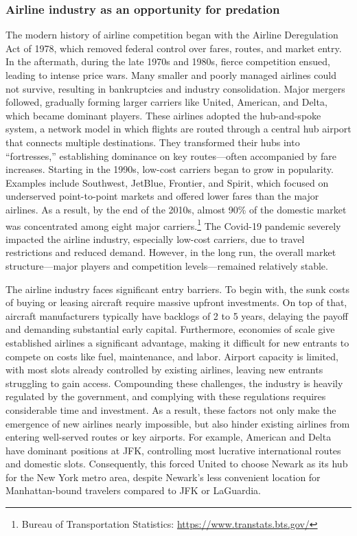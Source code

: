 \documentclass[12pt,oneside]{article}
\theoremstyle{definition}
\theoremstyle{remark}
\begin{document}
\subsubsection{Airline industry as an opportunity for predation}

The modern history of airline competition began with the Airline Deregulation Act of 1978, which removed federal control over fares, routes, and market entry. In the aftermath, during the late 1970s and 1980s, fierce competition ensued, leading to intense price wars. Many smaller and poorly managed airlines could not survive, resulting in bankruptcies and industry consolidation. Major mergers followed, gradually forming larger carriers like United, American, and Delta, which became dominant players. These airlines adopted the hub-and-spoke system, a network model in which flights are routed through a central hub airport that connects multiple destinations. They transformed their hubs into “fortresses,” establishing dominance on key routes—often accompanied by fare increases. Starting in the 1990s, low-cost carriers began to grow in popularity. Examples include Southwest, JetBlue, Frontier, and Spirit, which focused on underserved point-to-point markets and offered lower fares than the major airlines. As a result, by the end of the 2010s, almost 90\% of the domestic market was concentrated among eight major carriers.\footnote{Bureau of Transportation Statistics: \href{https://www.transtats.bts.gov/}{https://www.transtats.bts.gov/}} The Covid-19 pandemic severely impacted the airline industry, especially low-cost carriers, due to travel restrictions and reduced demand. However, in the long run, the overall market structure—major players and competition levels—remained relatively stable.

The airline industry faces significant entry barriers. To begin with, the sunk costs of buying or leasing aircraft require massive upfront investments. On top of that, aircraft manufacturers typically have backlogs of 2 to 5 years, delaying the payoff and demanding substantial early capital. Furthermore, economies of scale give established airlines a significant advantage, making it difficult for new entrants to compete on costs like fuel, maintenance, and labor. Airport capacity is limited, with most slots already controlled by existing airlines, leaving new entrants struggling to gain access. Compounding these challenges, the industry is heavily regulated by the government, and complying with these regulations requires considerable time and investment. As a result, these factors not only make the emergence of new airlines nearly impossible, but also hinder existing airlines from entering well-served routes or key airports. For example, American and Delta have dominant positions at JFK, controlling most lucrative international routes and domestic slots. Consequently, this forced United to choose Newark as its hub for the New York metro area, despite Newark’s less convenient location for Manhattan-bound travelers compared to JFK or LaGuardia.
\end{document}
